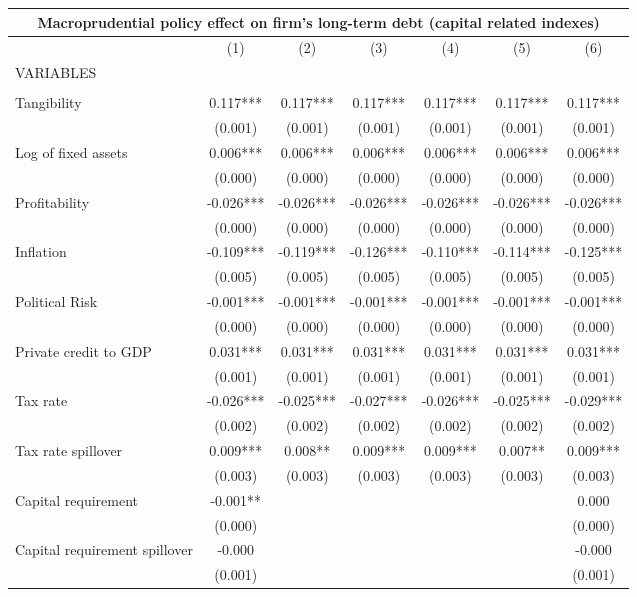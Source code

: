 \begin{tabular}{lcccccc}
\multicolumn{7}{c}{Macroprudential policy effect on firm's long-term debt (capital related indexes)} \\ \hline
 & (1) & (2) & (3) & (4) & (5) & (6) \\
VARIABLES &  &  &  &  &  &  \\ \hline
 &  &  &  &  &  &  \\
Tangibility & 0.117*** & 0.117*** & 0.117*** & 0.117*** & 0.117*** & 0.117*** \\
 & (0.001) & (0.001) & (0.001) & (0.001) & (0.001) & (0.001) \\
Log of fixed assets & 0.006*** & 0.006*** & 0.006*** & 0.006*** & 0.006*** & 0.006*** \\
 & (0.000) & (0.000) & (0.000) & (0.000) & (0.000) & (0.000) \\
Profitability & -0.026*** & -0.026*** & -0.026*** & -0.026*** & -0.026*** & -0.026*** \\
 & (0.000) & (0.000) & (0.000) & (0.000) & (0.000) & (0.000) \\
Inflation & -0.109*** & -0.119*** & -0.126*** & -0.110*** & -0.114*** & -0.125*** \\
 & (0.005) & (0.005) & (0.005) & (0.005) & (0.005) & (0.005) \\
Political Risk & -0.001*** & -0.001*** & -0.001*** & -0.001*** & -0.001*** & -0.001*** \\
 & (0.000) & (0.000) & (0.000) & (0.000) & (0.000) & (0.000) \\
Private credit to GDP & 0.031*** & 0.031*** & 0.031*** & 0.031*** & 0.031*** & 0.031*** \\
 & (0.001) & (0.001) & (0.001) & (0.001) & (0.001) & (0.001) \\
Tax rate & -0.026*** & -0.025*** & -0.027*** & -0.026*** & -0.025*** & -0.029*** \\
 & (0.002) & (0.002) & (0.002) & (0.002) & (0.002) & (0.002) \\
Tax rate spillover & 0.009*** & 0.008** & 0.009*** & 0.009*** & 0.007** & 0.009*** \\
 & (0.003) & (0.003) & (0.003) & (0.003) & (0.003) & (0.003) \\
Capital requirement & -0.001** &  &  &  &  & 0.000 \\
 & (0.000) &  &  &  &  & (0.000) \\
Capital requirement spillover & -0.000 &  &  &  &  & -0.000 \\
 & (0.001) &  &  &  &  & (0.001) \\

\end{tabular}
